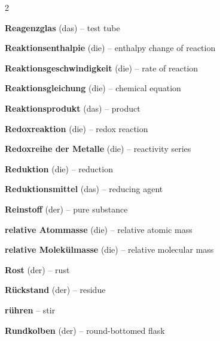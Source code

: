 \begin{multicols}{2}
\par\nopagebreak
\textbf{Reagenzglas} (das) -- test tube\dotfill\hyperref[e:39]{\pageref*{e:39}}\par
\textbf{Reaktionsenthalpie} (die) -- enthalpy change of reaction\dotfill\hyperref[e:140]{\pageref*{e:140}}\par
\textbf{Reaktionsgeschwindigkeit} (die) -- rate of reaction\dotfill\hyperref[e:143]{\pageref*{e:143}}\par
\textbf{Reaktionsgleichung} (die) -- chemical equation\dotfill\hyperref[e:129]{\pageref*{e:129}}\par
\textbf{Reaktionsprodukt} (das) -- product\dotfill\hyperref[e:127]{\pageref*{e:127}}\par
\textbf{Redoxreaktion} (die) -- redox reaction\dotfill\hyperref[e:185]{\pageref*{e:185}}\par
\textbf{Redoxreihe der Metalle} (die) -- reactivity series\dotfill\hyperref[e:194]{\pageref*{e:194}}\par
\textbf{Reduktion} (die) -- reduction\dotfill\hyperref[e:184]{\pageref*{e:184}}\par
\textbf{Reduktionsmittel} (das) -- reducing agent\dotfill\hyperref[e:187]{\pageref*{e:187}}\par
\textbf{Reinstoff} (der) -- pure substance\dotfill\hyperref[e:2]{\pageref*{e:2}}\par
\textbf{relative Atommasse} (die) -- relative atomic mass\dotfill\hyperref[e:82]{\pageref*{e:82}}\par
\textbf{relative Molekülmasse} (die) -- relative molecular mass\dotfill\hyperref[e:254]{\pageref*{e:254}}\par
\textbf{Rost} (der) -- rust\dotfill\hyperref[e:191]{\pageref*{e:191}}\par
\textbf{Rückstand} (der) -- residue\dotfill\hyperref[e:33]{\pageref*{e:33}}\par
\textbf{rühren} -- stir\dotfill\hyperref[e:66]{\pageref*{e:66}}\par
\textbf{Rundkolben} (der) -- round-bottomed flask\dotfill\hyperref[e:42]{\pageref*{e:42}}\par


\end{multicols}
